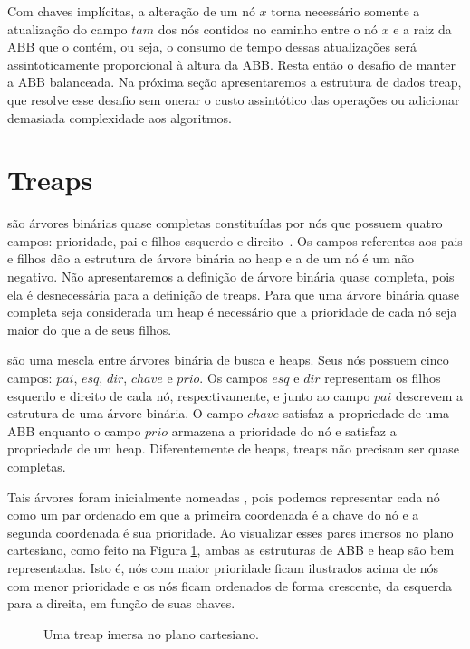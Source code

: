 Com chaves implícitas, a alteração de um nó $x$ torna necessário somente a atualização do campo $tam$ dos nós contidos no caminho entre o nó $x$ e a raiz da ABB que o contém, ou seja, o consumo de tempo dessas atualizações será assintoticamente proporcional à altura da ABB. Resta então o desafio de manter a ABB balanceada. Na próxima seção apresentaremos a estrutura de dados treap, que resolve esse desafio sem onerar o custo assintótico das operações ou adicionar demasiada complexidade aos algoritmos.

\section{Treaps}

 são árvores binárias quase completas constituídas por nós que possuem quatro campos: prioridade, pai e filhos esquerdo e direito~\cite{CLRS}.
Os campos referentes aos pais e filhos dão a estrutura de árvore binária ao heap e a  de um nó é um  não negativo.
Não apresentaremos a definição de árvore binária quase completa, pois ela é desnecessária para a definição de treaps. Para que uma árvore binária quase completa seja considerada um heap é necessário que a prioridade de cada nó seja maior do que a de seus filhos.

 são uma mescla entre árvores binária de busca e heaps. Seus nós possuem cinco campos: $pai$, $esq$, $dir$, $chave$ e $prio$. Os campos $esq$ e $dir$ representam os filhos esquerdo e direito de cada nó, respectivamente, e junto ao campo $pai$ descrevem a estrutura de uma árvore binária. O campo $chave$ satisfaz a propriedade de uma ABB enquanto o campo $prio$ armazena a prioridade do nó e satisfaz a propriedade de um heap. Diferentemente de heaps, treaps não precisam ser quase completas.


Tais árvores foram inicialmente nomeadas  \cite{Vuillemin1980AUL}, pois podemos representar cada nó como um par ordenado em que a primeira coordenada é a chave do nó e a segunda coordenada é sua prioridade. Ao visualizar esses pares imersos no plano cartesiano, como feito na Figura \ref{fig:TREAP}, ambas as estruturas de ABB e heap são bem representadas. Isto é, nós com maior prioridade ficam ilustrados acima de nós com menor prioridade e os nós ficam ordenados de forma crescente, da esquerda para a direita, em função de suas chaves.

\begin{figure}[htb]
\centering

\caption{Uma treap imersa no plano cartesiano.}
\label{fig:TREAP}
\end{figure}

